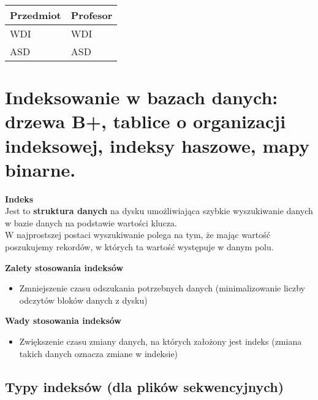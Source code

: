 \documentclass[main.tex]{subfiles}
\begin{document}
\begin{enumerate}
        \begin{table}[H]
            \begin{tabular}{|l|l|}
                \hline
                Przedmiot & Profesor \\ \hline
                WDI & WDI      \\ \hline
                ASD & ASD      \\ \hline
            \end{tabular}
        \end{table}


    \end{enumerate}

    \section{Indeksowanie w bazach danych: drzewa B+, tablice o organizacji indeksowej, indeksy haszowe, mapy binarne.}

    \begin{definition}
        \textbf{Indeks}\\
        Jest to \textbf{struktura danych} na dysku umożliwiająca szybkie wyszukiwanie danych w bazie danych na podstawie wartości klucza.\\

        W najprostszej postaci wyszukiwanie polega na tym, że mając wartość poszukujemy rekordów, w których ta wartość występuje w danym polu.
    \end{definition}

    \textbf{Zalety stosowania indeksów}\\
    \begin{itemize}
        \item Zmniejszenie czasu odszukania potrzebnych danych (minimalizowanie liczby odczytów bloków danych z dysku)
    \end{itemize}

    \textbf{Wady stosowania indeksów}\\
    \begin{itemize}
        \item Zwiększenie czasu zmiany danych, na których założony jest indeks (zmiana takich danych oznacza zmiane w indeksie)
    \end{itemize}

    \subsection{Typy indeksów (dla plików sekwencyjnych)}
\end{document}
